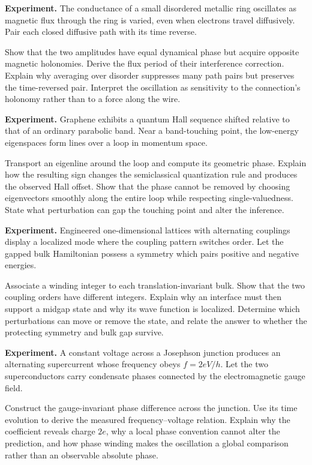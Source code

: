 \begin{exercise}
\textbf{Experiment.}
The conductance of a small disordered metallic ring oscillates as magnetic
flux through the ring is varied, even when electrons travel diffusively.
Pair each closed diffusive path with its time reverse.

Show that the two amplitudes have equal dynamical phase but acquire opposite
magnetic holonomies.  Derive the flux period of their interference correction.
Explain why averaging over disorder suppresses many path pairs but preserves
the time-reversed pair.  Interpret the oscillation as sensitivity to the
connection's holonomy rather than to a force along the wire.
\end{exercise}

\begin{exercise}
\textbf{Experiment.}
Graphene exhibits a quantum Hall sequence shifted relative to that of an
ordinary parabolic band.  Near a band-touching point, the low-energy
eigenspaces form lines over a loop in momentum space.

Transport an eigenline around the loop and compute its geometric phase.
Explain how the resulting sign changes the semiclassical quantization rule and
produces the observed Hall offset.  Show that the phase cannot be removed by
choosing eigenvectors smoothly along the entire loop while respecting
single-valuedness.  State what perturbation can gap the touching point and
alter the inference.
\end{exercise}

\begin{exercise}
\textbf{Experiment.}
Engineered one-dimensional lattices with alternating couplings display a
localized mode where the coupling pattern switches order.  Let the gapped
bulk Hamiltonian possess a symmetry which pairs positive and negative
energies.

Associate a winding integer to each translation-invariant bulk.  Show that
the two coupling orders have different integers.  Explain why an interface
must then support a midgap state and why its wave function is localized.
Determine which perturbations can move or remove the state, and relate the
answer to whether the protecting symmetry and bulk gap survive.
\end{exercise}

\begin{exercise}
\textbf{Experiment.}
A constant voltage across a Josephson junction produces an alternating
supercurrent whose frequency obeys \(f=2eV/h\).  Let the two superconductors
carry condensate phases connected by the electromagnetic gauge field.

Construct the gauge-invariant phase difference across the junction.  Use its
time evolution to derive the measured frequency--voltage relation.  Explain
why the coefficient reveals charge \(2e\), why a local phase convention
cannot alter the prediction, and how phase winding makes the oscillation a
global comparison rather than an observable absolute phase.
\end{exercise}
